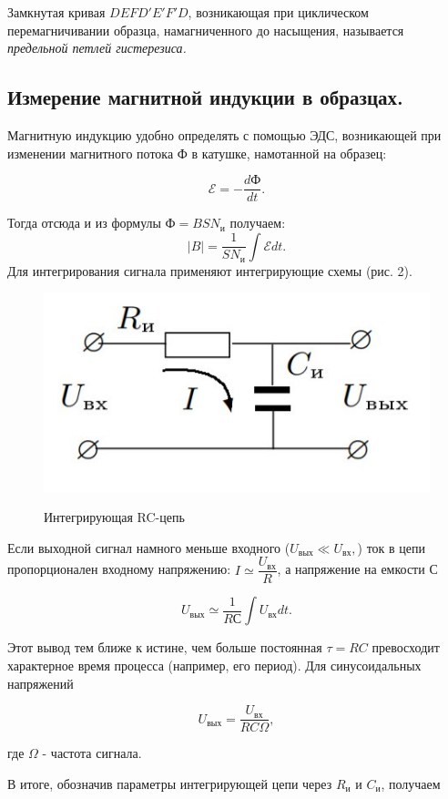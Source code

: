 \documentclass[12pt]{kiarticle} %
\begin{document}
	Замкнутая кривая $DEFD'E'F'D$, возникающая при циклическом
	перемагничивании образца, намагниченного до насыщения, называется \textit{предельной петлей гистерезиса.}
	
	
	\subsection{Измерение магнитной индукции в образцах.}
	Магнитную индукцию удобно определять с помощью ЭДС, возникающей при изменении магнитного потока Ф в катушке, намотанной на образец:
	
	$$\mathscr{E} = -\dfrac{dФ}{dt}.$$
	
	Тогда отсюда и из формулы $Ф=BSN_{и}$ получаем:
		$$|B|=\dfrac{1}{SN_{и}}\int \mathscr{E}dt.$$
	Для интегрирования сигнала применяют интегрирующие схемы (рис. 2).
	
		\begin{figure}
		\vspace{-20pt}
		\begin{center}
			\includegraphics[width=0.7\linewidth]{gist2.jpg}
			\label{fig:sdfsafd}
		\end{center}
		\vspace{-10pt}
		\caption{Интегрирующая RC-цепь}
	\end{figure}
	
	Если выходной сигнал намного меньше входного ($U_{вых}\ll U_{вх},$) ток в цепи пропорционален входному напряжению: $I\simeq\dfrac{U_{вх}}{R}$, а напряжение на емкости С
	
	$$U_{вых}\simeq\dfrac{1}{RС}\int U_{вх}dt.$$
	
	Этот вывод тем ближе к истине, чем больше постоянная $\tau=RC$ превосходит характерное время процесса (например, его период). Для синусоидальных напряжений
	
	$$U_{вых}=\dfrac{U_{вх}}{RC\Omega},$$
	
	где $\Omega$ - частота сигнала.
	
	В итоге, обозначив параметры интегрирующей цепи через $R_{и}$ и $C_{и}$, получаем
	
\end{document}
